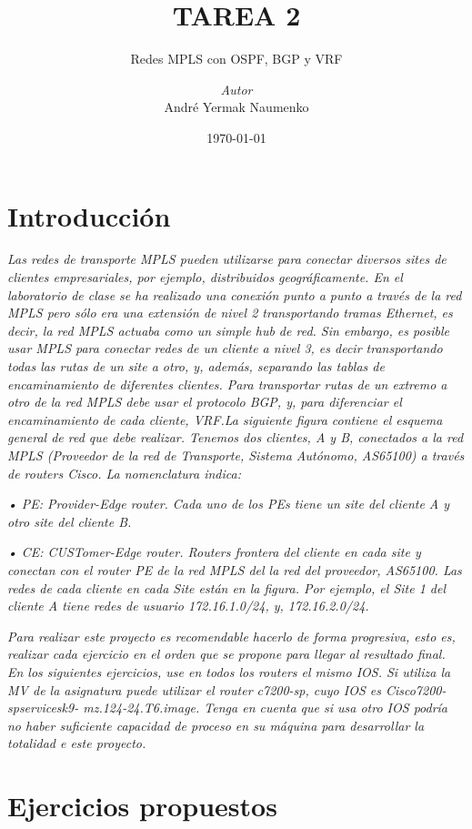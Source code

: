 \documentclass[a4paper, 12pt]{report}
\institute{Universidad Politécnica de Cartagena}
\title{TAREA 2}
\subtitle{Redes MPLS con OSPF, BGP y VRF}
\author{\textit{Autor}\\André Yermak Naumenko}
\date{\today}
\begin{document}
\maketitle
\romantableofcontents
\setcounter{section}{0}
\chapter{Introducción}

\textit{Las redes de transporte MPLS pueden utilizarse para conectar diversos sites de clientes empresariales, por ejemplo, distribuidos geográficamente. En el laboratorio de clase se ha realizado una conexión punto a punto a través de la red MPLS pero sólo era una extensión de nivel 2 transportando tramas Ethernet, es decir, la red MPLS actuaba como un simple hub de red. Sin embargo, es posible usar MPLS para conectar redes de un cliente a nivel 3, es decir transportando todas las rutas de un site a otro, y, además, separando las tablas de encaminamiento de diferentes clientes. Para transportar rutas de un extremo a otro de la red MPLS debe usar el protocolo BGP, y, para diferenciar el encaminamiento de cada cliente, VRF.La siguiente figura contiene el esquema general de red que debe realizar. Tenemos dos clientes, A y B, conectados a la red MPLS (Proveedor de la red de Transporte, Sistema Autónomo, AS65100) a través de routers Cisco. La nomenclatura indica:}

\textit{• PE: Provider-Edge router. Cada uno de los PEs tiene un site del cliente A y otro site del cliente B.}

\textit{• CE: CUSTomer-Edge router. Routers frontera del cliente en cada site y conectan con el router PE de la red MPLS del la red del proveedor, AS65100. Las redes de cada cliente en cada Site están en la figura. Por ejemplo, el Site 1 del cliente A tiene redes de usuario 172.16.1.0/24, y, 172.16.2.0/24.}

\textit{Para realizar este proyecto es recomendable hacerlo de forma progresiva, esto es, realizar cada ejercicio en el orden que se propone para llegar al resultado final. En los siguientes ejercicios, use en todos los routers el mismo IOS. Si utiliza la MV de la asignatura puede utilizar el router c7200-sp, cuyo IOS es Cisco7200-spservicesk9- mz.124-24.T6.image. Tenga en cuenta que si usa otro IOS podría no haber suficiente capacidad de proceso en su máquina para desarrollar la totalidad e este proyecto.}

\chapter{Ejercicios propuestos}
\end{document}
